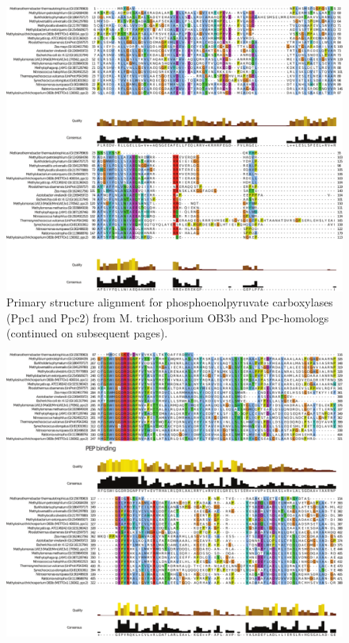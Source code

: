 \begin{figure}[H]
\centering
     \includegraphics[width=1.0\textwidth]{./tex/chapter1/figures/supplemental/FigureS6a.pdf}
     \begin{singlespace}
     \caption[Structure alignment for phosphoenolpyruvate carboxylases (Ppc1 and Ppc2) from M. trichosporium OB3b and Ppc-homologs]{
        Primary structure alignment for phosphoenolpyruvate carboxylases (Ppc1 and Ppc2) from M. trichosporium OB3b and Ppc-homologs (continued on subsequent pages).
        }
     \label{fig:S6}
     \end{singlespace}
\end{figure}

\begin{figure}[H]
\centering
     \includegraphics[width=1.0\textwidth]{./tex/chapter1/figures/supplemental/FigureS6c.pdf}
\end{figure}

